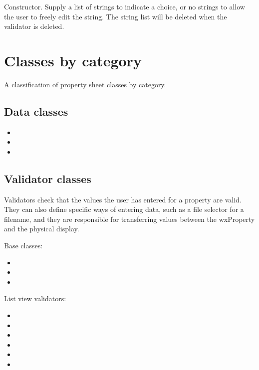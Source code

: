 

Constructor. Supply a list of strings to indicate a choice, or no strings to allow the
user to freely edit the string. The string list will be deleted when the validator is deleted.


\chapter{Classes by category}\label{classesbycat}

A classification of property sheet classes by category.

\section{Data classes}

\begin{itemize}\itemsep=0pt
\item {}
\item {}
\item {}
\end{itemize}


\section{Validator classes}\label{validatorclasses}

Validators check that the values the user has entered for a property are
valid. They can also define specific ways of entering data, such as a
file selector for a filename, and they are responsible for transferring
values between the wxProperty and the physical display. 

Base classes:

\begin{itemize}\itemsep=0pt
\item {}
\item {}
\item {}
\end{itemize}

List view validators:

\begin{itemize}\itemsep=0pt
\item {}
\item {}
\item {}
\item {}
\item {}
\item {}
\end{itemize}

